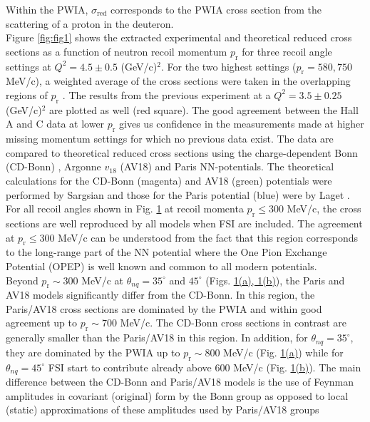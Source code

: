 Within the PWIA, $\sigma_{\mathrm{red}}$ corresponds to the PWIA cross section from the scattering of a proton in the deuteron. \\
\indent Figure \ref{fig:fig1} shows the extracted experimental and theoretical reduced cross sections as a function of neutron recoil momentum
$p_{\mathrm{r}}$ for three recoil angle settings at $Q^{2}=4.5\pm0.5$ (GeV/c)$^{2}$. For the two highest settings ($p_{\mathrm{r}}=580, 750$ MeV/c), a weighted average of the cross sections were taken in the overlapping regions of $p_{\mathrm{r}}$ . The results from the previous experiment \cite{PhysRevLett.107.262501} at a $Q^{2}=3.5\pm0.25$ (GeV/c)$^{2}$ are plotted as well (red square). The good agreement between the Hall A and C data at lower $p_{\mathrm{r}}$
gives us confidence in the measurements made at higher missing momentum settings for which no previous data exist.
The data are compared to theoretical reduced
cross sections using the charge-dependent Bonn (CD-Bonn) \cite{PhysRevC.63.024001}, Argonne $v_{18}$ (AV18) \cite{PhysRevC.51.38} and Paris \cite{PhysRevC.21.861} NN-potentials. The theoretical calculations
for the CD-Bonn (magenta) and AV18 (green) potentials were performed by Sargsian \cite{PhysRevC.82.014612} and those for the Paris potential (blue) were by Laget \cite{LAGET2005}.\\
\indent For all recoil angles shown in Fig. \hyperref[fig:fig1]{1} at recoil momenta $p_{\mathrm{r}}\leq300$ MeV/c, the cross sections are well reproduced  by  all models when FSI are included.
The agreement at $p_{\mathrm{r}}\leq300$ MeV/c can be understood from the fact that this region corresponds to the long-range part of the NN potential where the One Pion Exchange Potential (OPEP)
is well known and common to all modern potentials. \\
\indent Beyond $p_{\mathrm{r}}\sim300$ MeV/c at $\theta_{nq}=35^{\circ}$ and $45^{\circ}$ (Figs. \hyperref[fig:fig1]{1(a), 1(b)}), the Paris and
AV18 models significantly differ from the CD-Bonn. In this region, the Paris/AV18 cross sections are dominated by the PWIA and within good agreement up to $p_{\mathrm{r}}\sim700$ MeV/c. The CD-Bonn cross sections in contrast are generally smaller than the Paris/AV18 in this region.  In addition, for $\theta_{nq}=35^{\circ}$, they are dominated by the PWIA up to $p_{\mathrm{r}}\sim800$ MeV/c (Fig. \hyperref[fig:fig1]{1(a)})  while for $\theta_{nq}=45^{\circ}$  FSI start to contribute already above 600 MeV/c (Fig. \hyperref[fig:fig1]{1(b)}).
The main difference between the CD-Bonn and Paris/AV18 models is the use of Feynman amplitudes in covariant (original) form by the Bonn group as opposed to local (static) approximations of these amplitudes used by Paris/AV18 groups
